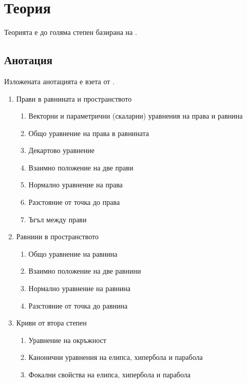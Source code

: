 \documentclass[
  numbers=endperiod,
  headings=standardclasses,
  bibliography=totocnumbered,
]{scrartcl}
\title{\Title{1}}
\subtitle{Уравнение на права и равнина. Формули за разстояния и ъгли. Криви от втора степен.}
\author{Янис Василев}
\date{\Revision{11 юни 2019}}
\begin{document}
\maketitle

\section{Теория}

Теорията е до голяма степен базирана на \cite{Notes}.

\subsection{Анотация}

Изложената анотацията е взета от \cite{Syllabus}.

\begin{enumerate}
  \item Прави в равнината и пространството
  \begin{enumerate}
    \item Векторни и параметрични (скаларни) уравнения на права и равнина
    \item Общо уравнение на права в равнината
    \item Декартово уравнение
    \item Взаимно положение на две прави
    \item Нормално уравнение на права
    \item Разстояние от точка до права
    \item Ъгъл между прави
  \end{enumerate}

  \item Равнини в пространството
  \begin{enumerate}
    \item Общо уравнение на равнина
    \item Взаимно положение на две равнини
    \item Нормално уравнение на равнина
    \item Разстояние от точка до равнина
  \end{enumerate}

  \item Криви от втора степен
  \begin{enumerate}
    \item Уравнение на окръжност
    \item Канонични уравнения на елипса, хипербола и парабола
    \item Фокални свойства на елипса, хипербола и парабола
  \end{enumerate}
\end{enumerate}
\end{document}
